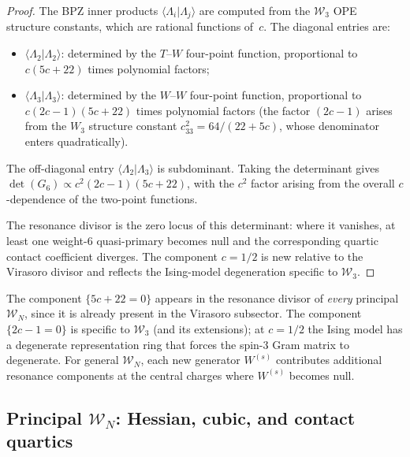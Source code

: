 \begin{proof}
The BPZ inner products $\langle\Lambda_i|\Lambda_j\rangle$ are
computed from the $\mathcal{W}_3$ OPE structure constants, which
are rational functions of~$c$.  The diagonal entries are:
\begin{itemize}
\item $\langle\Lambda_2|\Lambda_2\rangle$: determined by the
  $T$--$W$ four-point function, proportional to $c(5c+22)$
  times polynomial factors;
\item $\langle\Lambda_3|\Lambda_3\rangle$: determined by the
  $W$--$W$ four-point function, proportional to $c(2c-1)(5c+22)$
  times polynomial factors (the factor $(2c-1)$ arises from
  the $W_3$ structure constant
  $c_{33}^2 = 64/(22+5c)$, whose denominator enters quadratically).
\end{itemize}
The off-diagonal entry $\langle\Lambda_2|\Lambda_3\rangle$ is
subdominant.  Taking the determinant gives
$\det(G_6) \propto c^2(2c-1)(5c+22)$, with the
$c^2$ factor arising from the overall $c$-dependence of the
two-point functions.

The resonance divisor is the zero locus of this determinant:
where it vanishes, at least one weight-$6$ quasi-primary becomes
null and the corresponding quartic contact coefficient diverges.
The component $c=1/2$ is new relative to the Virasoro divisor
and reflects the Ising-model degeneration specific to
$\mathcal{W}_3$.\qedhere
\end{proof}

\begin{remark}
\label{rem:w-w3-lee-yang-universality}
The component $\{5c+22=0\}$ appears in the resonance divisor of
\emph{every} principal $\mathcal{W}_N$, since it is already present
in the Virasoro subsector.  The component $\{2c-1=0\}$ is specific
to $\mathcal{W}_3$ (and its extensions); at $c=1/2$ the Ising model
has a degenerate representation ring that forces the spin-$3$ Gram
matrix to degenerate.  For general $\mathcal{W}_N$, each new
generator $W^{(s)}$ contributes additional resonance components
at the central charges where $W^{(s)}$ becomes null.
\end{remark}

\subsection{Principal \texorpdfstring{$\mathcal{W}_N$}{WN}: Hessian, cubic, and contact quartics}
\label{subsec:w-principal-wn-shadows}

